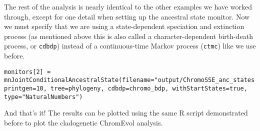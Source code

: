 The rest of the analysis is nearly identical to the other examples we have worked through,
except for one detail when setting up the ancestral state monitor.
Now we must specify that we are using a state-dependent speciation and extinction
process (as mentioned above this is also called a character-dependent birth-death process, or \texttt{cdbdp})
instead of a continuous-time Markov process (\texttt{ctmc}) like we use before.
{\tt \begin{snugshade*}
\begin{lstlisting}
monitors[2] = mnJointConditionalAncestralState(filename="output/ChromoSSE_anc_states.log", printgen=10, tree=phylogeny, cdbdp=chromo_bdp, withStartStates=true, type="NaturalNumbers")
\end{lstlisting}
\end{snugshade*}
}
And that's it! The results can be plotted using the same R script 
demonstrated before to plot the cladogenetic ChromEvol analysis.

\newpage
